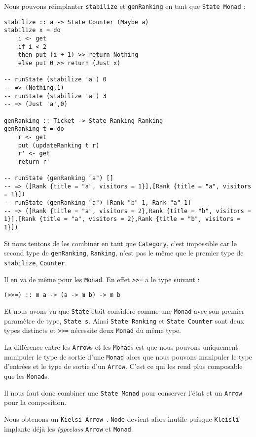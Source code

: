 \documentclass{llncs}
\newcommand{\Arr}{\lstinline{Arrow} }
\newcommand{\Arrp}{\lstinline{Arrow}. }
\newcommand{\Arrs}{\lstinline{Arrow}s }
\begin{document}
Nous pouvons réimplanter \lstinline{stabilize} et \lstinline{genRanking} en tant
que \lstinline{State Monad} :
\begin{lstlisting}
stabilize :: a -> State Counter (Maybe a)
stabilize x = do
    i <- get
    if i < 2
    then put (i + 1) >> return Nothing
    else put 0 >> return (Just x)

-- runState (stabilize 'a') 0
-- => (Nothing,1)
-- runState (stabilize 'a') 3
-- => (Just 'a',0)

genRanking :: Ticket -> State Ranking Ranking
genRanking t = do
    r <- get
    put (updateRanking t r)
    r' <- get
    return r'

-- runState (genRanking "a") []
-- => ([Rank {title = "a", visitors = 1}],[Rank {title = "a", visitors = 1}])
-- runState (genRanking "a") [Rank "b" 1, Rank "a" 1] 
-- => ([Rank {title = "a", visitors = 2},Rank {title = "b", visitors = 1}],[Rank {title = "a", visitors = 2},Rank {title = "b", visitors = 1}])
\end{lstlisting}

Si nous tentons de les combiner en tant que \lstinline{Category}, c'est impossible
car le second type de \lstinline{genRanking}, \lstinline{Ranking}, n'est pas le
même que le premier type de \lstinline{stabilize}, \lstinline{Counter}.

Il en va de même pour les \lstinline{Monad}.
En effet \lstinline{>>=} a le type suivant :
\begin{lstlisting}
(>>=) :: m a -> (a -> m b) -> m b
\end{lstlisting}

Et nous avons vu que \lstinline{State} était considéré comme une \lstinline{Monad}
avec son premier paramètre de type, \lstinline{State s}.
Ainsi \lstinline{State Ranking} et \lstinline{State Counter} sont deux types distincts
et \lstinline{>>=} nécessite deux \lstinline{Monad} du même type.

La différence entre les \Arrs et les \lstinline{Monad}s est que nous pouvons
uniquement manipuler le type de sortie d'une \lstinline{Monad} alors que nous pouvons
manipuler le type d'entrées et le type de sortie d'un \Arrp
C'est ce qui les rend plus composable que les \lstinline{Monad}s.

Il nous faut donc combiner une \lstinline{State Monad} pour conserver l'état et un
\lstinline{Arrow} pour la composition.

Nous obtenons un \lstinline{Kielsi Arrow}~\cite{Hughes00}.
\lstinline{Node} devient alors inutile puisque \lstinline{Kleisli} implante déjà les
\emph{typeclass} \Arr et \lstinline{Monad}.
\end{document}

